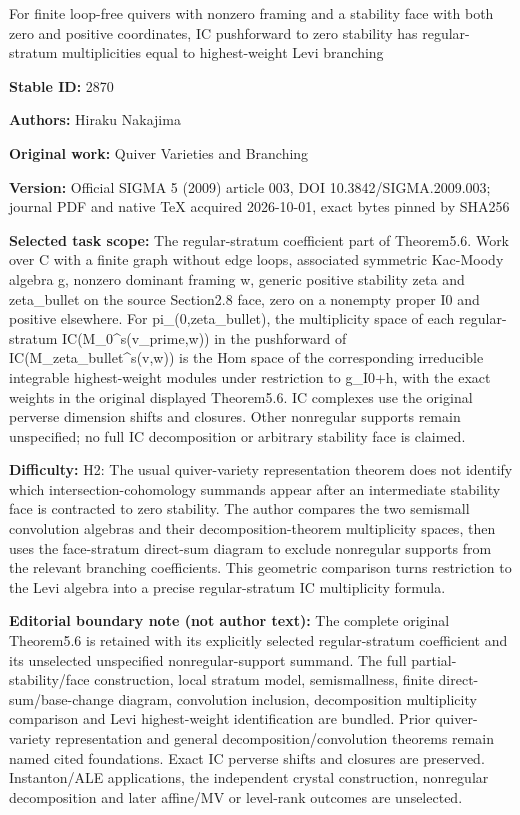 \documentclass[11pt]{article}
\theoremstyle{definition}
\numberwithin{equation}{section}
\begin{document}
\begin{center}\Large For finite loop-free quivers with nonzero framing and a stability face with both zero and positive coordinates, IC pushforward to zero stability has regular-stratum multiplicities equal to highest-weight Levi branching\end{center}
\noindent\textbf{Stable ID:} 2870\par
\noindent\textbf{Authors:} Hiraku Nakajima\par
\noindent\textbf{Original work:} Quiver Varieties and Branching\par
\noindent\textbf{Version:} Official SIGMA 5 (2009) article 003, DOI 10.3842/SIGMA.2009.003; journal PDF and native TeX acquired 2026-10-01, exact bytes pinned by SHA256\par
\noindent\textbf{Selected task scope:} The regular-stratum coefficient part of Theorem5.6. Work over C with a finite graph without edge loops, associated symmetric Kac-Moody algebra g, nonzero dominant framing w, generic positive stability zeta and zeta\_bullet on the source Section2.8 face, zero on a nonempty proper I0 and positive elsewhere. For pi\_(0,zeta\_bullet), the multiplicity space of each regular-stratum IC(M\_0\textasciicircum{}s(v\_prime,w)) in the pushforward of IC(M\_zeta\_bullet\textasciicircum{}s(v,w)) is the Hom space of the corresponding irreducible integrable highest-weight modules under restriction to g\_I0+\allowbreak{}h, with the exact weights in the original displayed Theorem5.6. IC complexes use the original perverse dimension shifts and closures. Other nonregular supports remain unspecified; no full IC decomposition or arbitrary stability face is claimed.\par
\noindent\textbf{Difficulty:} H2: The usual quiver-variety representation theorem does not identify which intersection-cohomology summands appear after an intermediate stability face is contracted to zero stability. The author compares the two semismall convolution algebras and their decomposition-theorem multiplicity spaces, then uses the face-stratum direct-sum diagram to exclude nonregular supports from the relevant branching coefficients. This geometric comparison turns restriction to the Levi algebra into a precise regular-stratum IC multiplicity formula.\par
\noindent\textbf{Editorial boundary note (not author text):} The complete original Theorem5.6 is retained with its explicitly selected regular-stratum coefficient and its unselected unspecified nonregular-support summand. The full partial-stability/face construction, local stratum model, semismallness, finite direct-sum/base-change diagram, convolution inclusion, decomposition multiplicity comparison and Levi highest-weight identification are bundled. Prior quiver-variety representation and general decomposition/convolution theorems remain named cited foundations. Exact IC perverse shifts and closures are preserved. Instanton/ALE applications, the independent crystal construction, nonregular decomposition and later affine/MV or level-rank outcomes are unselected.\par
\end{document}

